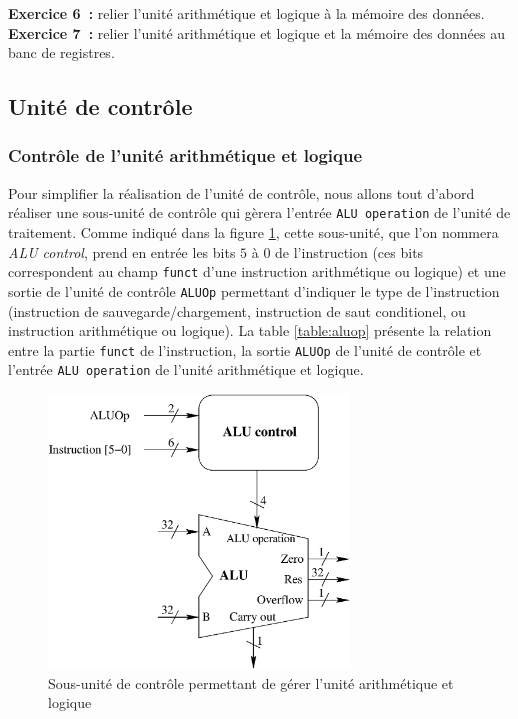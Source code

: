 \documentclass[12pt]{article}
\begin{document}
\textbf{Exercice 6~:} relier l'unité arithmétique et logique à la mémoire des données.\\

\textbf{Exercice 7~:} relier l'unité arithmétique et logique et la mémoire des données au banc de registres.\\

\subsection{Unité de contrôle}

\subsubsection{Contrôle de l'unité arithmétique et logique}

Pour simplifier la réalisation de l'unité de contrôle, nous allons tout d'abord réaliser une sous-unité de contrôle qui gèrera l'entrée \verb+ALU operation+
de l'unité de traitement. Comme indiqué dans la figure \ref{fig:alu-control}, cette sous-unité, que l'on nommera \emph{ALU control}, prend en entrée
les bits $5$ à $0$ de l'instruction (ces bits correspondent au champ \verb+funct+ d'une instruction arithmétique ou logique) et une sortie de l'unité
de contrôle \verb+ALUOp+ permettant d'indiquer le type de l'instruction (instruction de sauvegarde/chargement, instruction de saut conditionel, ou
instruction arithmétique ou logique). La table \ref{table:aluop} présente la relation entre la partie \verb+funct+ de l'instruction,
la sortie \verb+ALUOp+ de l'unité de contrôle et l'entrée \verb+ALU operation+
de l'unité arithmétique et logique.

\begin{figure}[!htpb]
\begin{center}
\includegraphics[width=8cm]{alu-control.eps}
\caption{Sous-unité de contrôle permettant de gérer l'unité arithmétique et logique}
\label{fig:alu-control}
\end{center}
\end{figure}
\end{document}
